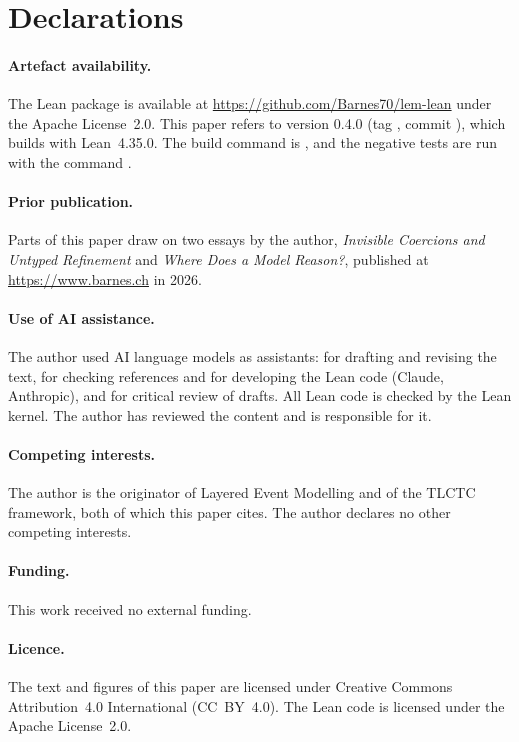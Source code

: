 \section*{Declarations}

\paragraph{Artefact availability.} The Lean package  is available at
\url{https://github.com/Barnes70/lem-lean} under the Apache License~2.0. This paper
refers to version 0.4.0 (tag , commit ), which builds with
Lean~4.35.0. The build command is
, and the negative tests are run with the command
.

\paragraph{Prior publication.} Parts of this paper draw on two essays by the author,
\emph{Invisible Coercions and Untyped Refinement} and \emph{Where Does a Model Reason?},
published at \url{https://www.barnes.ch} in 2026.

\paragraph{Use of AI assistance.} The author used AI language models as assistants: for
drafting and revising the text, for checking references and for developing the Lean
code (Claude, Anthropic), and for critical review of drafts. All Lean code is checked
by the Lean kernel. The author has reviewed the content and is responsible for it.

\paragraph{Competing interests.} The author is the originator of Layered Event Modelling
and of the TLCTC framework, both of which this paper cites. The author declares no other
competing interests.

\paragraph{Funding.} This work received no external funding.

\paragraph{Licence.} The text and figures of this paper are licensed under Creative
Commons Attribution~4.0 International (CC~BY~4.0). The Lean code is licensed under the
Apache License~2.0.
